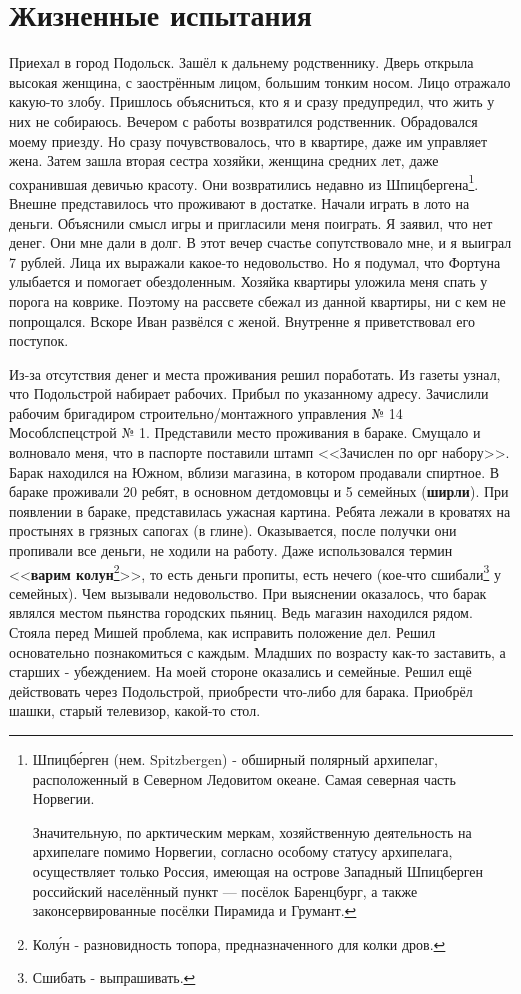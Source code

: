 ﻿\chapter{Жизненные испытания}

Приехал в город Подольск. Зашёл к дальнему родственнику. Дверь открыла высокая женщина, с заострённым лицом, большим тонким носом. Лицо отражало какую-то злобу. Пришлось объясниться, кто я и сразу предупредил, что жить у них не собираюсь. Вечером с работы возвратился родственник. Обрадовался моему приезду. Но сразу почувствовалось, что в квартире, даже им управляет жена. Затем зашла вторая сестра хозяйки, женщина средних лет, даже сохранившая девичью красоту. Они возвратились недавно из Шпицбергена\footnote{Шпицб\'{е}рген (нем. Spitzbergen) - обширный полярный архипелаг, расположенный в Северном Ледовитом океане. Самая северная часть Норвегии. 

Значительную, по арктическим меркам, хозяйственную деятельность на архипелаге помимо Норвегии, согласно особому статусу архипелага, осуществляет только Россия, имеющая на острове Западный Шпицберген российский населённый пункт — посёлок Баренцбург, а также законсервированные посёлки Пирамида и Грумант.}. 
Внешне представилось что проживают в достатке. Начали играть в лото на деньги. Объяснили смысл игры и пригласили меня поиграть. Я заявил, что нет денег. Они мне дали в долг. В этот вечер счастье сопутствовало мне, и я выиграл 7 рублей. Лица их выражали какое-то недовольство. Но я подумал, что Фортуна улыбается и помогает обездоленным. Хозяйка квартиры уложила меня спать у порога на коврике. Поэтому на рассвете сбежал из данной квартиры, ни с кем не попрощался. Вскоре Иван развёлся с женой. Внутренне я приветствовал его поступок.

Из-за отсутствия денег и места проживания решил поработать. Из газеты узнал, что Подольстрой набирает рабочих. Прибыл по указанному адресу. Зачислили рабочим бригадиром строительно\-/монтажного управления № 14 Мособлспецстрой № 1. Представили место проживания в бараке. Смущало и волновало меня, что в паспорте поставили штамп <<Зачислен по орг набору>>. Барак находился на Южном, вблизи магазина, в котором продавали спиртное. В бараке проживали 20 ребят, в основном детдомовцы и 5 семейных (\textbf{ширли}). При появлении в бараке, представилась ужасная картина. Ребята лежали в кроватях на простынях в грязных сапогах (в глине). Оказывается, после получки они пропивали все деньги, не ходили на работу. Даже использовался термин <<\textbf{варим колун}\footnote{Кол\'{у}н - разновидность топора, предназначенного для колки дров.}>>, то есть деньги пропиты, есть нечего (кое-что сшибали\footnote{Сшибать - выпрашивать.} у семейных). Чем вызывали недовольство. При выяснении оказалось, что барак являлся местом пьянства городских пьяниц. Ведь магазин находился рядом. Стояла перед Мишей проблема, как исправить положение дел. Решил основательно познакомиться с каждым. Младших по возрасту как-то заставить, а старших - убеждением. На моей стороне оказались и семейные. Решил ещё действовать через Подольстрой, приобрести что-либо для барака. Приобрёл шашки, старый телевизор, какой-то стол.

